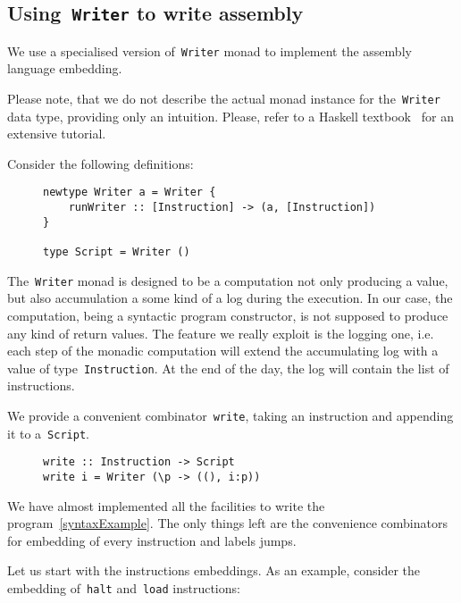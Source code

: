 \subsection{Using~\texttt{Writer} to write assembly}

We use a specialised version of~\texttt{Writer} monad
to implement the assembly language embedding.

Please note, that we do not describe the actual monad instance for
the~\texttt{Writer} data type, providing only an intuition.
Please, refer to a Haskell textbook~\cite{Lipovaca:2011:LYH:2018642} for an
extensive tutorial.

Consider the following definitions:

\begin{figure}[H]
\begin{verbatim}
newtype Writer a = Writer {
    runWriter :: [Instruction] -> (a, [Instruction])
}

type Script = Writer ()
\end{verbatim}
\end{figure}

The~\texttt{Writer} monad is designed to be a computation not only
producing a value, but also accumulation a some kind of a log during the execution.
In our case, the computation, being a syntactic program constructor, is not supposed
to produce any kind of return values. The feature we really exploit is the logging one,
i.e. each step of the monadic computation will extend the accumulating log with a
value of type~\texttt{Instruction}. At the end of the day, the log will
contain the list of instructions.

We provide a convenient combinator~\texttt{write}, taking an instruction
and appending it to a~\texttt{Script}.

\begin{figure}[H]
\begin{verbatim}
write :: Instruction -> Script
write i = Writer (\p -> ((), i:p))
\end{verbatim}
\end{figure}

We have almost implemented all the facilities to write the program~\ref{syntaxExample}.
The only things left are the convenience combinators for embedding of every instruction
and labels jumps.

Let us start with the instructions embeddings. As an example, consider the
embedding of~\texttt{halt} and~\texttt{load} instructions:

